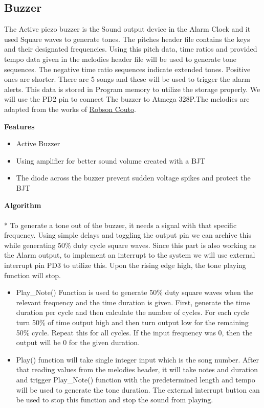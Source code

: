 \subsection{Buzzer}

The Active piezo buzzer is the Sound output device in the Alarm Clock and it used Square waves to generate tones. The pitches header file contains the keys and their designated frequencies. Using this pitch data, time ratios and provided tempo data given in the melodies header file will be used to generate tone sequences. The negative time ratio sequences indicate extended tones. Positive ones are shorter. There are 5 songs and these will be used to trigger the alarm alerts. This data is stored in Program memory to utilize the storage properly. We will use the PD2 pin to connect The buzzer to Atmega 328P.The melodies are adapted from the works of \href{https://github.com/robsoncouto}{Robson Couto}.


\Large \textbf{Features}
\normalsize
\begin{itemize}
  \item Active Buzzer 
  \item Using amplifier for better sound volume created with a BJT
  \item The diode across the buzzer prevent sudden voltage spikes and protect the BJT	
\end{itemize}
\Large \textbf{Algorithm}\\[0.1cm]
\\*
\normalsize{To generate a tone out of the buzzer, it needs a signal with that specific frequency. Using simple delays and toggling the output pin we can archive this while generating 50\% duty cycle square waves. Since this part is also working as the Alarm output, to implement an interrupt to the system we will use external interrupt pin PD3 to utilize this. Upon the rising edge high, the tone playing function will stop.}
\begin{itemize}
  \item Play\_Note() Function is used to generate 50\% duty square waves when the relevant frequency and the time duration is given.  First, generate the time duration per cycle and then calculate the number of cycles. For each cycle turn 50\% of time output high and then turn output low for the remaining 50\% cycle. Repeat this for all cycles. If the input frequency was 0, then the output will be 0 for the given duration. 
  \item Play() function will take single integer input which is the song number. After that reading values from the melodies header, it will take notes and duration and trigger Play\_Note() function with the predetermined length and tempo will be used to generate the tone duration. The external interrupt button can be used to stop this function and stop the sound from playing.
\end{itemize}


